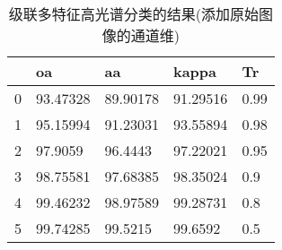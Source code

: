 \documentclass[runningheads]{llncs}
\begin{document}
\begin{table}[]
\caption{级联多特征高光谱分类的结果(添加原始图像的通道维)}
\centering
\setlength\tabcolsep{25pt}
\label{tab:my-table}
\begin{tabular}{lllll}
\toprule
  & oa       & aa       & kappa    & Tr   \\
   \midrule
0 & 93.47328 & 89.90178 & 91.29516 & 0.99 \\
1 & 95.15994 & 91.23031 & 93.55894 & 0.98 \\
2 & 97.9059  & 96.4443  & 97.22021 & 0.95 \\
3 & 98.75581 & 97.68385 & 98.35024 & 0.9  \\
4 & 99.46232 & 98.97589 & 99.28731 & 0.8  \\
5 & 99.74285 & 99.5215  & 99.6592  & 0.5 \\
\bottomrule
\end{tabular}
\end{table}
\end{document}
